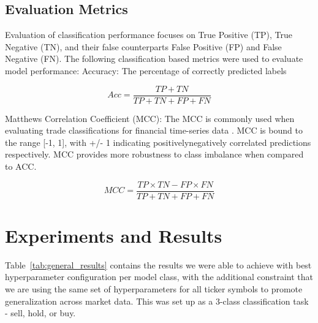 \documentclass[10pt,twocolumn,letterpaper]{article}
\begin{document}
\subsection{Evaluation Metrics}
Evaluation of classification performance focuses on True Positive (TP), True Negative (TN), and their false counterparts False Positive (FP) and False Negative (FN). The following classification based metrics were used to evaluate model performance:
Accuracy: The percentage of correctly predicted labels
 
\begin{equation} \label{eq:accuracy}
    Acc = \frac{TP + TN}{TP + TN + FP + FN}
\end{equation}

Matthews Correlation Coefficient (MCC): The MCC is commonly used when evaluating trade classifications for financial time-series data \cite{STT_Paper,STLAT_sota,zou_survey}. MCC is bound to the range [-1, 1], with +/- 1 indicating positively\/negatively correlated predictions respectively. MCC provides more robustness to class imbalance when compared to ACC.

\begin{equation} \label{eq:mcc}
    MCC = \frac{TP \times TN - FP \times FN}{TP + TN + FP + FN}
\end{equation}


\section{Experiments and Results}

Table~\ref{tab:general_results} contains the results we were able to achieve with best hyperparameter configuration per model class, with the additional constraint that we are using the same set of hyperparameters for all ticker symbols to promote generalization across market data. This was set up as a 3-class classification task - sell, hold, or buy.

\begin{table}
\begin{center}
\end{center}
\caption{Data splits and time frames.}
\label{tab:general_results}
\end{table}
\end{document}
